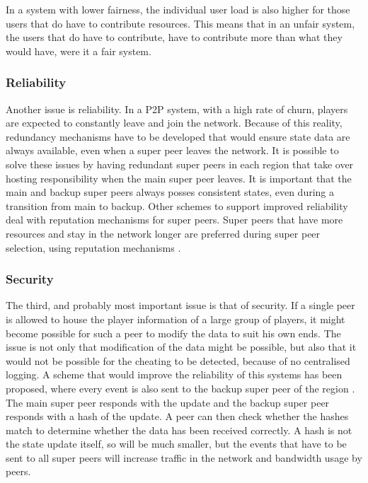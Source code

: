 \documentclass[10pt,a4paper,journal,cspaper,compsoc]{IEEEtran}
\begin{document}
In a system with lower fairness, the individual user load is also higher for those users that do have to contribute resources. This means that in an
unfair system, the users that do have to contribute, have to contribute more than what they would have, were it a fair system.

\subsubsection{Reliability}
\label{super_peer_storage_reliability}

Another issue is reliability. In a P2P system, with a high rate of churn, players are expected to constantly leave and join the network. Because of
this reality, redundancy mechanisms have to be developed that would ensure state data are always available, even when a super peer leaves the
network. It is possible to solve these issues by having redundant super peers in each region that take over hosting responsibility when the main
super peer leaves. It is important that the main and backup super peers always posses consistent states, even during a transition from main to
backup. Other schemes to support improved reliability deal with reputation mechanisms for super peers. Super peers that have more resources and stay
in the network longer are preferred during super peer selection, using reputation mechanisms \cite{fan_mediator_paper}.

\subsubsection{Security}
The third, and probably most important issue is that of security. If a single peer is allowed to house the player information of a large group of
players, it might become possible for such a peer to modify the data to suit his own ends. The issue is not only that modification of the data might
be possible, but also that it would not be possible for the cheating to be detected, because of no centralised logging. A scheme that would improve
the reliability of this systems has been proposed, where every event is also sent to the backup super peer of the region \cite{past_storage_focus}.
The main super peer responds with the update and the backup super peer responds with a hash of the update. A peer can then check whether the hashes
match to determine whether the data has been received correctly. A hash is not the state update itself, so will be much smaller, but the events that
have to be sent to all super peers will increase traffic in the network and bandwidth usage by peers.
\end{document}
